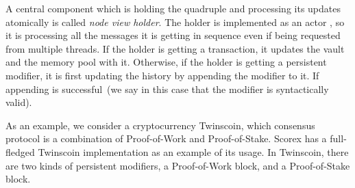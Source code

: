 A central component which is holding the quadruple {\em <history, minimal state, vault, memory pool>} and processing its updates atomically is called {\em node view holder}. The holder is implemented as an actor , so it is processing all the messages it is getting in sequence even if being requested from multiple threads. If the holder is getting a transaction, it updates the vault and the memory pool with it. Otherwise, if the holder is getting a persistent modifier, it is first updating the history by appending the modifier to it. If appending is successful~(we say in this case that the modifier is syntactically valid). 

As an example, we consider a cryptocurrency Twinscoin, which consensus protocol is a combination of Proof-of-Work and Proof-of-Stake. Scorex has a full-fledged Twinscoin implementation as an example of its usage. In Twinscoin, there are two kinds of persistent modifiers, a Proof-of-Work block, and a Proof-of-Stake block. 
